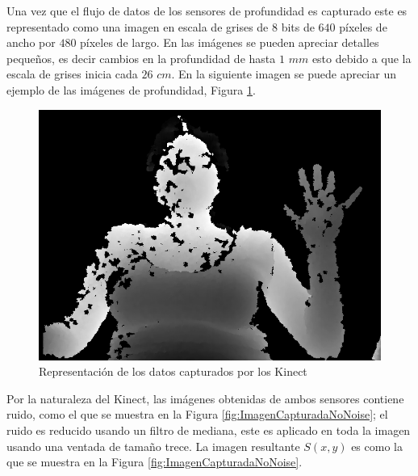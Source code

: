 Una vez que el flujo de datos de los sensores de profundidad es capturado este es representado como una imagen en escala de grises de $8$ bits de $640$ p\'ixeles de ancho por $480$ p\'ixeles de largo. En las imágenes se pueden apreciar detalles pequeños, es decir cambios en la profundidad de hasta $1$ $mm$ esto debido a que la escala de grises inicia cada $26$ $cm$. 
En la siguiente imagen se puede apreciar un ejemplo de las imágenes de profundidad, Figura \ref{fig:ImagenCapturada}.

\begin{figure}[h!]
\begin{center}
\includegraphics[scale=.35]{./Figures/166.png}
\end{center}
\caption{Representación de los datos capturados por los Kinect}
\label{fig:ImagenCapturada}
\end{figure}  

Por la naturaleza del Kinect, las imágenes obtenidas de ambos sensores contiene ruido, como el que se muestra en la Figura \ref{fig:ImagenCapturadaNoNoise}; el ruido es reducido usando un filtro de mediana, este es aplicado en toda la imagen usando una ventada de tamaño trece. La imagen resultante $S(x,y)$ es como la que se muestra en la Figura \ref{fig:ImagenCapturadaNoNoise}.

